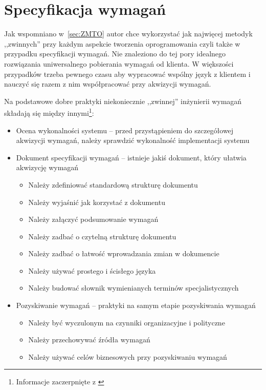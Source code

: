 \chapter{Specyfikacja wymagań}
\label{cha:specyfikacjaWymagan}

Jak wspomniano w~\ref{sec:ZMTO} autor chce wykorzystać jak najwięcej metodyk ,,zwinnych'' przy każdym aspekcie tworzenia oprogramowania czyli także w przypadku specyfikacji wymagań. Nie znaleziono do tej pory idealnego rozwiązania uniwersalnego pobierania wymagań od klienta. W większości przypadków trzeba pewnego czasu aby wypracować wspólny język z klientem i nauczyć się razem z nim współpracować przy akwizycji wymagań.

Na podstawowe dobre praktyki niekoniecznie ,,zwinnej'' inżynierii wymagań składają się między innymi\footnote{Informacje zaczerpnięte z \cite{Wol09p}}:


\begin{itemize}
    \item Ocena wykonalności systemu -- przed przystąpieniem do szczegółowej akwizycji wymagań, należy sprawdzić wykonalność implementacji systemu
    \item Dokument specyfikacji wymagań -- istnieje jakiś dokument, który ułatwia akwizycję wymagań
    \begin{itemize}
        \item Należy zdefiniować standardową strukturę dokumentu
        \item Należy wyjaśnić jak korzystać z dokumentu
        \item Należy załączyć podsumowanie wymagań
        \item Należy zadbać o czytelną strukturę dokumentu
        \item Należy zadbać o łatwość wprowadzania zmian w dokumencie
        \item Należy używać prostego i ścisłego języka
        \item Należy budować słownik wymienianych terminów specjalistycznych
    \end{itemize}
    \item Pozyskiwanie wymagań -- praktyki na samym etapie pozyskiwania wymagań
    \begin{itemize}
        \item Należy być wyczulonym na czynniki organizacyjne i polityczne
        \item Należy przechowywać źródła wymagań
        \item Należy używać celów biznesowych przy pozyskiwaniu wymagań 
    \end{itemize}
\end{itemize}



